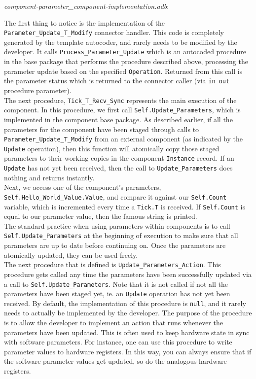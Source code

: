 \textit{component-parameter\_component-implementation.adb}:

The first thing to notice is the implementation of the \texttt{Parameter\_Update\_T\_Modify} connector handler. This code is completely generated by the template autocoder, and rarely needs to be modified by the developer. It calls \texttt{Process\_Parameter\_Update} which is an autocoded procedure in the base package that performs the procedure described above, processing the parameter update based on the specified \texttt{Operation}. Returned from this call is the parameter status which is returned to the connector caller (via \texttt{in out} procedure parameter). \\

The next procedure, \texttt{Tick\_T\_Recv\_Sync} represents the main execution of the component. In this procedure, we first call \texttt{Self.Update\_Parameters}, which is implemented in the component base package. As described earlier, if all the parameters for the component have been staged through calls to \texttt{Parameter\_Update\_T\_Modify} from an external component (as indicated by the \texttt{Update} operation), then this function will atomically copy those staged parameters to their working copies in the component \texttt{Instance} record. If an \texttt{Update} has not yet been received, then the call to \texttt{Update\_Parameters} does nothing and returns instantly. \\

Next, we access one of the component's parameters, \texttt{Self.Hello\_World\_Value.Value}, and compare it against our \texttt{Self.Count} variable, which is incremented every time a \texttt{Tick.T} is received. If \texttt{Self.Count} is equal to our parameter value, then the famous string is printed. \\

The standard practice when using parameters within components is to call \texttt{Self.Update\_Parameters} at the beginning of execution to make sure that all parameters are up to date before continuing on. Once the parameters are atomically updated, they can be used freely. \\

The next procedure that is defined is \texttt{Update\_Parameters\_Action}. This procedure gets called any time the parameters have been successfully updated via a call to \texttt{Self.Update\_Parameters}. Note that it is not called if not all the parameters have been staged yet, ie. an \texttt{Update} operation has not yet been received. By default, the implementation of this procedure is \texttt{null}, and it rarely needs to actually be implemented by the developer. The purpose of the procedure is to allow the developer to implement an action that runs whenever the parameters have been updated. This is often used to keep hardware state in sync with software parameters. For instance, one can use this procedure to write parameter values to hardware registers. In this way, you can always ensure that if the software parameter values get updated, so do the analogous hardware registers. \\


